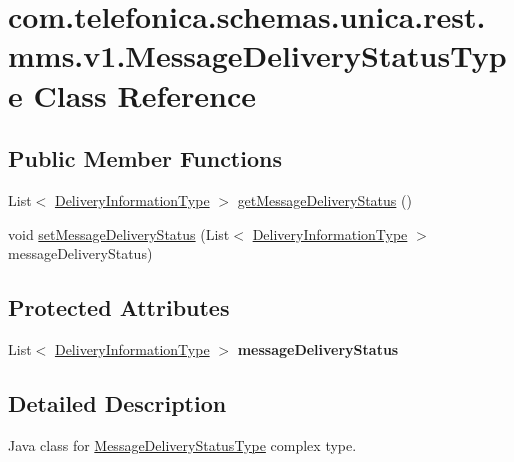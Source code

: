 \hypertarget{classcom_1_1telefonica_1_1schemas_1_1unica_1_1rest_1_1mms_1_1v1_1_1MessageDeliveryStatusType}{
\section{com.telefonica.schemas.unica.rest.mms.v1.MessageDeliveryStatusType Class Reference}
\label{classcom_1_1telefonica_1_1schemas_1_1unica_1_1rest_1_1mms_1_1v1_1_1MessageDeliveryStatusType}
}
\subsection*{Public Member Functions}
\begin{DoxyCompactItemize}
\item 
List$<$ \hyperlink{classcom_1_1telefonica_1_1schemas_1_1unica_1_1rest_1_1mms_1_1v1_1_1DeliveryInformationType}{DeliveryInformationType} $>$ \hyperlink{classcom_1_1telefonica_1_1schemas_1_1unica_1_1rest_1_1mms_1_1v1_1_1MessageDeliveryStatusType_a7d06e04f5fa1880084b75bd0a2c2509c}{getMessageDeliveryStatus} ()
\item 
void \hyperlink{classcom_1_1telefonica_1_1schemas_1_1unica_1_1rest_1_1mms_1_1v1_1_1MessageDeliveryStatusType_a5ece8de88af1ce2066e6d7f9cc6632d2}{setMessageDeliveryStatus} (List$<$ \hyperlink{classcom_1_1telefonica_1_1schemas_1_1unica_1_1rest_1_1mms_1_1v1_1_1DeliveryInformationType}{DeliveryInformationType} $>$ messageDeliveryStatus)
\end{DoxyCompactItemize}
\subsection*{Protected Attributes}
\begin{DoxyCompactItemize}
\item 
\hypertarget{classcom_1_1telefonica_1_1schemas_1_1unica_1_1rest_1_1mms_1_1v1_1_1MessageDeliveryStatusType_a445253c38a25862f72cc29efe80b8300}{
List$<$ \hyperlink{classcom_1_1telefonica_1_1schemas_1_1unica_1_1rest_1_1mms_1_1v1_1_1DeliveryInformationType}{DeliveryInformationType} $>$ {\bfseries messageDeliveryStatus}}
\label{classcom_1_1telefonica_1_1schemas_1_1unica_1_1rest_1_1mms_1_1v1_1_1MessageDeliveryStatusType_a445253c38a25862f72cc29efe80b8300}

\end{DoxyCompactItemize}


\subsection{Detailed Description}
Java class for \hyperlink{classcom_1_1telefonica_1_1schemas_1_1unica_1_1rest_1_1mms_1_1v1_1_1MessageDeliveryStatusType}{MessageDeliveryStatusType} complex type.

